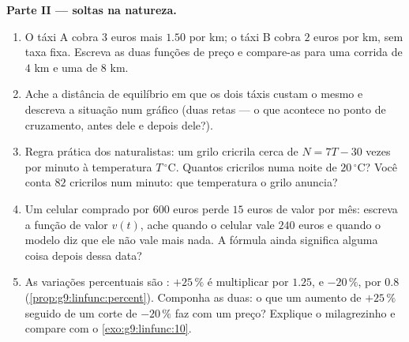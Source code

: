 \begin{problem}
\medskip
\noindent\textbf{Parte II ---  soltas na natureza.}
\begin{enumerate}[resume]
  \item O táxi A cobra $3$ euros mais $1.50$ por km; o táxi B cobra
        $2$ euros por km, sem taxa fixa. Escreva as duas funções de
        preço e compare-as para uma corrida de $4$ km e uma de $8$ km.
  \item Ache a distância de equilíbrio em que os dois táxis custam o
        mesmo e descreva a situação num gráfico (duas retas --- o que
        acontece no ponto de cruzamento, antes dele e depois dele?).
  \item Regra prática dos naturalistas: um grilo cricrila cerca de
        $N = 7T - 30$ vezes por minuto à temperatura $T\,^\circ$C.
        Quantos cricrilos numa noite de $20\,^\circ$C? Você conta $82$
        cricrilos num minuto: que temperatura o grilo anuncia?
  \item Um celular comprado por $600$ euros perde $15$ euros de valor
        por mês: escreva a função de valor $v(t)$, ache quando o
        celular vale $240$ euros e quando o modelo diz que ele não vale
        mais nada. A fórmula ainda significa alguma coisa depois dessa
        data?
  \item As variações percentuais são : $+25\,\%$ é
        multiplicar por $1.25$, e $-20\,\%$, por $0.8$
        (\cref{prop:g9:linfunc:percent}). Componha as duas: o que um
        aumento de $+25\,\%$ seguido de um corte de $-20\,\%$ faz com
        um preço? Explique o milagrezinho e compare com o
        \cref{exo:g9:linfunc:10}.
\end{enumerate}


\end{problem}
